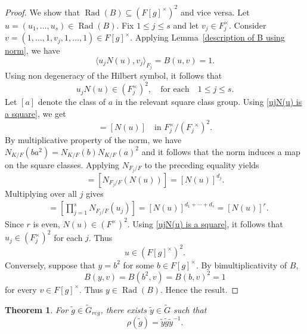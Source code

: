 \documentclass[11pt, a4paper, reqno]{amsart}
\newtheorem{theorem}{Theorem}[section]
\theoremstyle{definition}
\theoremstyle{remark}
\theoremstyle{example}
\theoremstyle{note}
\numberwithin{equation}{section}
\DeclareMathOperator{\Rad}{Rad}
\begin{document}
\begin{proof} We show that $\Rad(B)\subseteq (F[g]^\times)^{2}$ and vice versa. Let $u=(u_1,\ldots,u_s)\in\Rad(B)$. Fix $1\leq j\leq s$ and let  $v_j\in F_j^\times$. Consider $v=(1,\ldots,1,v_j,1,\ldots,1) \in F[g]^\times$. Applying Lemma~\ref{description of B using norm}, we have 
\begin{equation*}
\bigl\langle u_jN(u),v_j\bigr\rangle_{F_j}=B(u,v)=1.
\end{equation*}
 Using non degeneracy of the Hilbert
symbol, it follows that 
\begin{equation}\label{ujN(u) is a square}
u_{j}N(u)\in (F_{j}^{\times})^{2}, \quad \text{for each} \quad 1\leq j \leq s.\end{equation}
Let $[a]$ denote the class of $a$ in the relevant square class group.  Using \eqref{ujN(u) is a square}, we get  
\begin{equation*}
[u_j]=[N(u)]
\quad \text{in }F_j^\times/({F_j}^\times)^{2}.
\end{equation*}
By multiplicative property of the norm, we have $N_{K/F}(b a^2)=N_{K/F}(b)N_{K/F}(a)^2$ and it follows that the norm induces a map on the square classes. Applying 
$N_{F_j/F}$ to the preceding equality yields
\begin{equation*}
[N_{F_j/F}(u_j)]
=[N_{F_j/F}(N(u))]=[N(u)]^{d_j}.
\end{equation*}
Multiplying over all $j$ gives
\begin{align*}
[N(u)]
&=\left[\prod_{j=1}^s N_{F_j/F}(u_j)\right]=[N(u)]^{d_1+\cdots+d_s}=[N(u)]^r.
\end{align*}
Since $r$ is even, $N(u)\in (F^{\times})^{2}$. Using \eqref{ujN(u) is a square}, it follows that $u_{j}\in (F_{j}^{\times})^{2}$ for each $j$. Thus \[u\in (F[g]^\times)^2.\] 
Conversely, suppose that $y=b^2$ for some $b\in F[g]^\times$.  By
bimultiplicativity of $B$,
\begin{equation*}
B(y,v)=B(b^2,v)=B(b,v)^2=1
\end{equation*}
for every $v\in F[g]^\times$.  Thus
$y\in\Rad(B)$. Hence the result. 
\end{proof}








\begin{theorem}\label{thm:even-conjugacy} For $\tilde{g}\in \widetilde{G}_{reg}$, there exists $\tilde{y}\in\widetilde{G}$ such that 
\[\rho(\tilde{g})=\tilde{y}\tilde{g}\tilde{y}^{-1}.
\]
\end{theorem}
\end{document}
